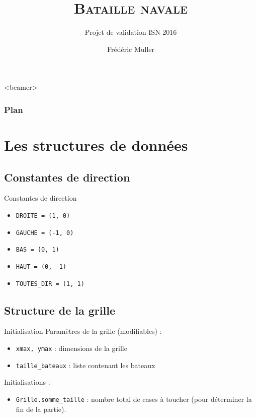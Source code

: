 





\title[Bataille navale]{\textsc{Bataille navale}}
\subtitle{Projet de validation ISN 2016}
\author{Frédéric Muller}
\date{}

\AtBeginSubsection[]
{
  \begin{frame}<beamer>
    \frametitle{Plan}
    \tableofcontents[currentsection,currentsubsection,    subsubsectionstyle=hide]
  \end{frame}
}





\begin{frame}
\titlepage
\end{frame}

\section{Les structures de données}
\subsection{Constantes de direction}
\begin{frame}{Constantes de direction}
\begin{itemize}
\item \texttt{DROITE = (1, 0)} 
\item \texttt{GAUCHE = (-1, 0)}
\item \texttt{BAS = (0, 1)}
\item \texttt{HAUT = (0, -1)}
\item \texttt{TOUTES\_DIR = (1, 1)}
\end{itemize}
\end{frame}

\subsection{Structure de la grille}
\begin{frame}{Initialisation}
Paramètres de la grille (modifiables) :
\begin{itemize}
\item \texttt{xmax, ymax} : dimensions de la grille
\item \texttt{taille\_bateaux} : liste contenant les bateaux
\end{itemize}\pause
Initialisations :
\begin{itemize}
\item \texttt{Grille.somme\_taille} : nombre total de cases à toucher (pour déterminer la fin de la partie).
\end{itemize}
\end{frame}


